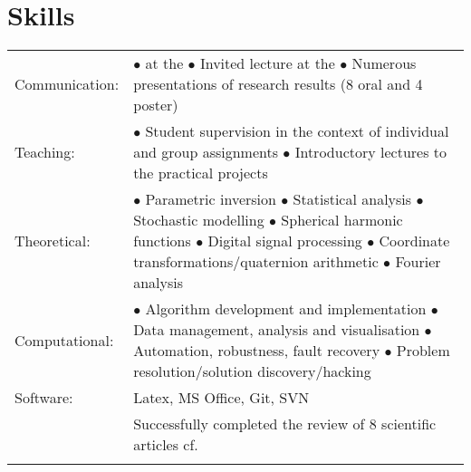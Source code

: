 \documentclass[a4paper]{article}
\newcommand{\dynhref}[2]{%
  \iftoggle{expliciturl}{%
    #2 (\href{#1}{\texttt{\detokenize{#1}}})%
  }{%
    \href{#1}{#2}%
  }%
}
\newcommand{\procv}[2]{\iftoggle{professionalcv}{#1}{#2}}
\newlength{\listskipbig}
\newenvironment{cvsection}[2]{
  \setlength{\floatsep}{0pt}
  \setlength{\textfloatsep}{0pt}
  \setlength{\intextsep}{0pt}
  \section*{#1}
  \begin{longtable}{lp{#2}}
}{
  \end{longtable}
}
\begin{document}
\pagebreak


\begin{cvsection}{Skills}{11.2cm}

Communication:  & $\bullet$ \dynhref{http://tinyurl.com/h928s3c}{Invited talk} at the \dynhref{http://fallmeeting.agu.org/2015/}{American Geophysical Union Fall Meeting in 2015}\newline
                  $\bullet$ Invited lecture at the \dynhref{http://data-assimilation.com}{Summer School on Data Assimilation and its applications in Oceanography, Hydrology, Risk \& Safety and Reservoir Engineering in 2017}\newline
                  $\bullet$ Numerous presentations of research results (8 oral and 4 poster)\\[\listskipbig]

Teaching:      & $\bullet$ Student supervision in the context of individual and group assignments\newline
                 $\bullet$ Introductory lectures to the practical projects\\[\listskipbig]

Theoretical:   & $\bullet$ Parametric inversion\newline
                 $\bullet$ Statistical analysis\newline
                 $\bullet$ Stochastic modelling\newline
                 $\bullet$ Spherical harmonic functions\newline
                 $\bullet$ Digital signal processing\newline
                 $\bullet$ Coordinate transformations\slash quaternion arithmetic\newline
                 $\bullet$ Fourier analysis\\[\listskipbig]

Computational:  & $\bullet$ Algorithm development and implementation\newline
                  $\bullet$ Data management, analysis and visualisation\newline
                  $\bullet$ Automation, robustness, fault recovery\newline
                  $\bullet$ Problem resolution\slash solution discovery\slash hacking\\[\listskipbig]

Software: & Latex, MS Office, Git, SVN\\[\listskipbig]
\procv{}{
Articles review: & Successfully completed the review of 8 scientific articles cf. \dynhref{https://publons.com/a/782170/}{Publons}\\[\listskipbig]
}


\end{cvsection}
\end{document}
